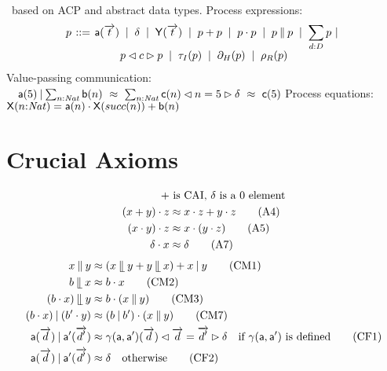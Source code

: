\begin{slide}
\mcrl\ based on ACP and abstract data types.
\pause
Process expressions:
\begin{gather*}
p\mathbin{\,::=\,}\mathsf{a}(\overrightarrow{t})\mathbin{~|~}\delta\mathbin{~|~}\mathsf{Y}(\overrightarrow{t})\mathbin{~|~} p+p\mathbin{~|~} p\mathbin{\cdot} p\mathbin{~|~} p\mathbin{\parallel} p\mathbin{~|~}\sum_{d{:} D}p\mathbin{~|~}\\[-1ex]
p\lhd c\rhd p\mathbin{~|~}\tau_{I}(p)\mathbin{~|~}\partial_{H}(p)\mathbin{~|~}\rho_{R}(p)
\end{gather*}
\pause
Value-passing communication:\\
$\quad\mathsf{a}(5)\mathbin{\mid}\sum_{n{:}\mathit{Nat}}\mathsf{b}(n)~\approx~\sum_{n{:}\mathit{Nat}}\mathsf{c}(n)\lhd n=5\rhd\delta~\approx~\mathsf{c}(5)$
\pause
Process equations: $\mathsf{X}(n{:}\mathit{Nat})=\mathsf{a}(n)\mathbin{\cdot}\mathsf{X}(succ(n))+\mathsf{b}(n)$
\newslide\section*{Crucial Axioms}
\vspace{-1.5ex}
\begin{footnotesize}
  \begin{align}
    +&\text{ is CAI, }\delta\text{ is a 0 element}\notag\\
    (x+y)\seqc z&\id x\seqc z+ y\seqc z\tag{A4}\label{eq:A4}\\
    (x\seqc y)\seqc z&\id x\seqc (y\seqc z)\tag{A5}\label{eq:A5}\\
    \delta\seqc x&\id \delta\tag{A7}\label{eq:A7}%
  \end{align}
  \begin{align}
    x\mathbin{\parallel} y&\approx (x\mathbin{\mathrel{\llfloor}} y+y\mathbin{\mathrel{\llfloor}} x)+x\mathbin{\mid} y\tag{CM1}\label{eq:CM1}\\
    b\mathbin{\mathrel{\llfloor}} x&\approx b\mathbin{\cdot} x\tag{CM2}\label{eq:CM2}\\
    (b\mathbin{\cdot} x)\mathbin{\mathrel{\llfloor}} y&\approx b\mathbin{\cdot}(x\mathbin{\parallel} y)\tag{CM3}\label{eq:CM3}\\
    (b\mathbin{\cdot} x)\mathbin{\mid}(b'\mathbin{\cdot} y)&\approx (b\mathbin{\mid} b')\mathbin{\cdot}(x\mathbin{\parallel} y)\tag{CM7}\label{eq:CM7}\\
    \mathsf{a}(\overrightarrow{d})\mathbin{\mid} \mathsf{a'}(\overrightarrow{d'})&\approx \gamma(\mathsf{a},\mathsf{a'})(\overrightarrow{d})\lhd
    \overrightarrow{d}=\overrightarrow{d'}\rhd\delta\quad\text{if}~\gamma(\mathsf{a},\mathsf{a'})~\text{is defined}\tag{CF1}\label{eq:CF1}\\
    \mathsf{a}(\overrightarrow{d})\mathbin{\mid} \mathsf{a'}(\overrightarrow{d'})&\approx \delta\quad\text{otherwise}\tag{CF2}\label{eq:CF2}
  \end{align}
\end{footnotesize}

\end{slide}
